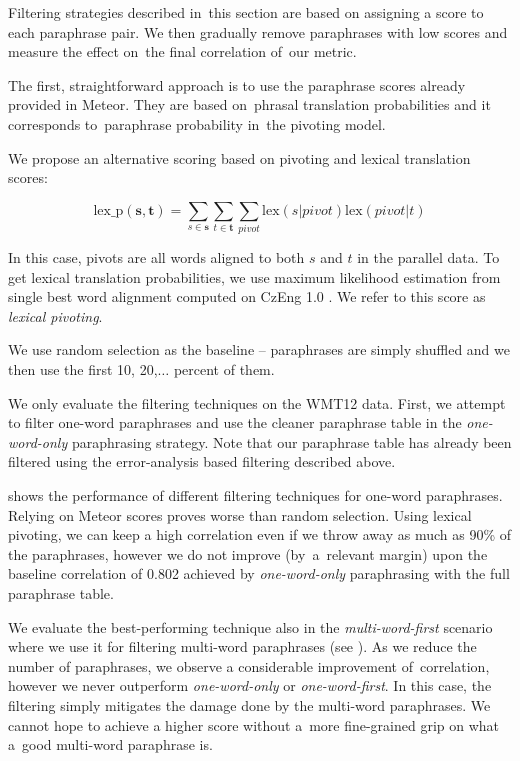 Filtering strategies described in~this section are based on assigning a score to
each paraphrase pair. We then gradually remove paraphrases with low scores and
measure the effect on~the final correlation of~our metric.

The first, straightforward approach is to use the paraphrase scores already
provided in Meteor. They are based on~phrasal translation probabilities
and it corresponds to~paraphrase probability in~the pivoting model.

We propose an alternative scoring based on pivoting and lexical translation
scores:

$$\text{lex\_p}(\mathbf{s},\mathbf{t}) = \sum_{s \in \mathbf{s}}\sum_{t \in
\mathbf{t}}\sum_{pivot}\text{lex}(s|pivot)\text{lex}(pivot|t)$$

In this case, pivots are all words aligned to both $s$ and $t$ in the parallel
data. To get lexical translation probabilities, we use maximum likelihood
estimation from single best word alignment computed on CzEng 1.0
\citep{czeng10:lrec2012}. We refer to this score as \emph{lexical
pivoting}.

We use random selection as the baseline -- paraphrases are simply shuffled and we
then use the first 10, 20,$\ldots$ percent of them.

We only evaluate the filtering techniques on the WMT12 data. First, we attempt
to filter one-word paraphrases and use the cleaner paraphrase table in the
\emph{one-word-only} paraphrasing strategy. Note that our paraphrase table has
already been filtered using the error-analysis based filtering described above.

 shows the performance of different filtering
techniques for one-word paraphrases. Relying on Meteor scores proves worse than
random selection. Using lexical pivoting, we can keep a high correlation even if we
throw away as much as 90\% of the paraphrases, however we do not improve 
(by~a~relevant margin) upon the baseline correlation of 0.802 achieved by
\emph{one-word-only} paraphrasing with the full paraphrase table.

We evaluate the best-performing technique also in the \textit{multi-word-first}
scenario where we use it for filtering multi-word paraphrases (see
). As we reduce the number of paraphrases, we observe a
considerable improvement of~correlation, however we never outperform
\textit{one-word-only} or \textit{one-word-first}. In this case, the filtering
simply mitigates the damage done by the multi-word paraphrases. We
cannot hope to achieve a higher score without a~more fine-grained grip on what
a~good multi-word paraphrase is.

